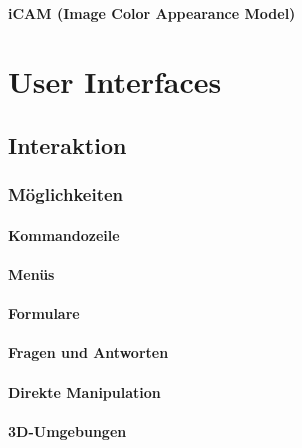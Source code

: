 \documentclass[a4paper, 11pt, accentcolor = tud3b]{tudreport}
\begin{document}
				\subsubsection{iCAM (Image Color Appearance Model)} %

	\chapter{User Interfaces} %

		\section{Interaktion} %

			\subsection{Möglichkeiten} %

				\subsubsection{Kommandozeile} %

				\subsubsection{Menüs} %

				\subsubsection{Formulare} %

				\subsubsection{Fragen und Antworten} %

				\subsubsection{Direkte Manipulation} %

				\subsubsection{3D-Umgebungen} %
\end{document}
